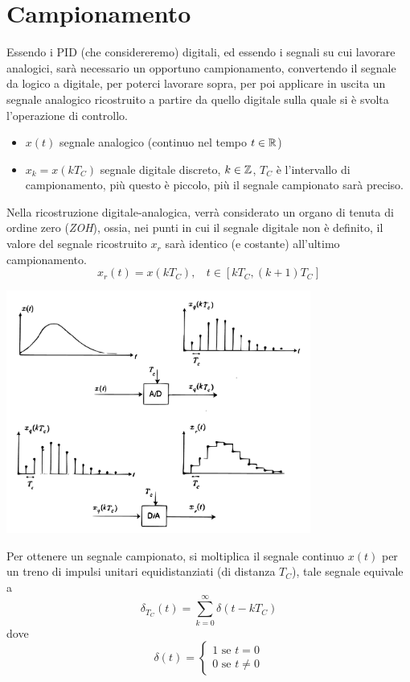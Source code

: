\documentclass[10pt, letterpaper]{report}
\begin{document}
\section{Campionamento}
Essendo i PID (che considereremo) digitali, ed essendo i segnali su cui lavorare analogici, sarà necessario un opportuno campionamento, convertendo il segnale da logico a digitale, per poterci lavorare sopra, per poi applicare in uscita un segnale analogico ricostruito a partire da quello digitale sulla quale si è svolta l'operazione di controllo.
\begin{itemize}
    \item $x(t)$ segnale analogico (continuo nel tempo $t\in{\mathbb R}$)
    \item $x_k=x(kT_C)$ segnale digitale discreto, $k\in{\mathbb Z}$, $T_C$ è l'intervallo di campionamento, più questo è piccolo, più il segnale campionato sarà preciso. 
\end{itemize}
Nella ricostruzione digitale-analogica, verrà considerato un organo di tenuta di ordine zero (\textit{ZOH}), ossia, nei punti in cui il segnale digitale non è definito, il valore del segnale ricostruito $ x_r$ sarà identico (e costante) all'ultimo campionamento.
$$ x_r(t)=x(kT_C), \ \ \ \ t\in [kT_C, (k+1)T_C]$$
\begin{center}
    \includegraphics[width=0.75\textwidth]{images/campionamento.pdf}
\end{center}
Per ottenere un segnale campionato, si moltiplica il segnale continuo $x(t)$ per un treno di impulsi unitari equidistanziati (di distanza $T_C$), tale segnale equivale a 
$$ \delta_{T_C}(t)=\sum_{k=0}^\infty \delta(t-kT_C)$$ 
dove 
$$ \delta(t)=\begin{cases}
    1 \text{ se } t=0 \\0 \text{ se } t\ne 0 
\end{cases}$$
\end{document}
